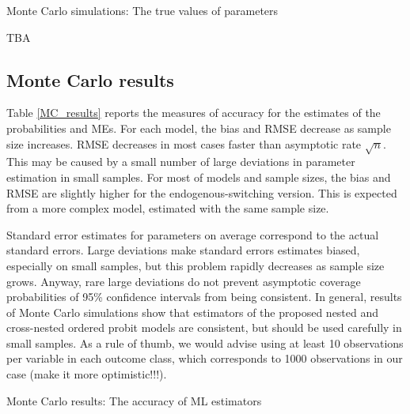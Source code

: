 \documentclass[letterpaper,fleqn,12pt]{article}
\begin{document}
\begin{onehalfspace}
\begin{table}[H]
\caption{Monte Carlo simulations: The true values of parameters\label{True
param}}%
\centering%

\begin{center}
TBA
\end{center}

\end{table}%

\subsection*{Monte Carlo results}

Table \ref{MC_results} reports the measures of accuracy for the estimates of
the probabilities and MEs. For each model, the bias and RMSE decrease as
sample size increases. RMSE decreases in most cases faster than asymptotic
rate $\sqrt{n}$. This may be caused by a small number of large deviations in
parameter estimation in small samples. For most of models and sample sizes,
the bias and RMSE are slightly higher for the endogenous-switching version.
This is expected from a more complex model, estimated with the same sample
size.

Standard error estimates for parameters on average correspond to the actual
standard errors. Large deviations make standard errors estimates biased,
especially on small samples, but this problem rapidly decreases as sample
size grows. Anyway, rare large deviations do not prevent asymptotic coverage
probabilities of 95\% confidence intervals from being consistent. In
general, results of Monte Carlo simulations show that estimators of the
proposed nested and cross-nested ordered probit models are consistent, but
should be used carefully in small samples. As a rule of thumb, we would
advise using at least 10 observations per variable in each outcome class,
which corresponds to 1000 observations in our case (make it more
optimistic!!!).

\bigskip

\begin{table}[H] \captionsetup{singlelinecheck = false, justification=justified}%

\caption{Monte Carlo results: The accuracy of ML
estimators\label{MC_results}}%
\centering%


\end{table}
\end{onehalfspace}
\end{document}
